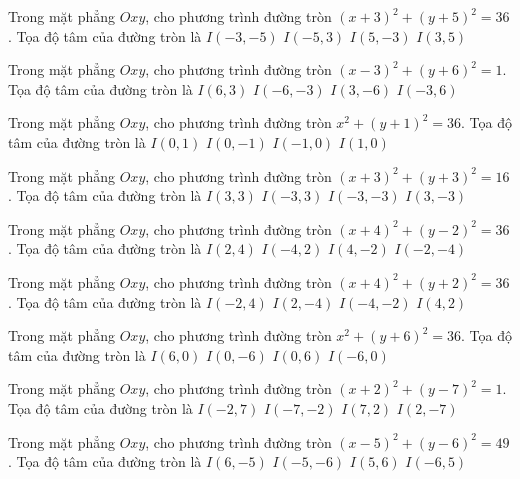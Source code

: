 \begin{ex}
Trong mặt phẳng $Oxy$, cho phương trình đường tròn $(x + 3)^2  + (y + 5)^2 = 36$. Tọa độ tâm của đường tròn là
\choice
{ \True $I(-3, -5)$ }
{ $I(-5, 3)$ }
{ $I(5, -3)$ }
{ $I(3, 5)$ }
\end{ex}

\begin{ex}
Trong mặt phẳng $Oxy$, cho phương trình đường tròn $(x -3)^2   + (y + 6)^2 = 1$. Tọa độ tâm của đường tròn là
\choice
{ $I(6, 3)$ }
{ $I(-6, -3)$ }
{ \True $I(3, -6)$ }
{ $I(-3, 6)$ }
\end{ex}

\begin{ex}
Trong mặt phẳng $Oxy$, cho phương trình đường tròn $x^2 + (y + 1)^2 = 36$. Tọa độ tâm của đường tròn là
\choice
{ $I(0, 1)$ }
{ \True $I(0, -1)$ }
{ $I(-1, 0)$ }
{ $I(1, 0)$ }
\end{ex}

\begin{ex}
Trong mặt phẳng $Oxy$, cho phương trình đường tròn $(x + 3)^2  + (y + 3)^2 = 16$. Tọa độ tâm của đường tròn là
\choice
{ $I(3, 3)$ }
{ $I(-3, 3)$ }
{ \True $I(-3, -3)$ }
{ $I(3, -3)$ }
\end{ex}

\begin{ex}
Trong mặt phẳng $Oxy$, cho phương trình đường tròn $(x + 4)^2  + (y -2)^2 = 36$. Tọa độ tâm của đường tròn là
\choice
{ $I(2, 4)$ }
{ \True $I(-4, 2)$ }
{ $I(4, -2)$ }
{ $I(-2, -4)$ }
\end{ex}

\begin{ex}
Trong mặt phẳng $Oxy$, cho phương trình đường tròn $(x + 4)^2  + (y + 2)^2 = 36$. Tọa độ tâm của đường tròn là
\choice
{ $I(-2, 4)$ }
{ $I(2, -4)$ }
{ \True $I(-4, -2)$ }
{ $I(4, 2)$ }
\end{ex}

\begin{ex}
Trong mặt phẳng $Oxy$, cho phương trình đường tròn $x^2 + (y + 6)^2 = 36$. Tọa độ tâm của đường tròn là
\choice
{ $I(6, 0)$ }
{ \True $I(0, -6)$ }
{ $I(0, 6)$ }
{ $I(-6, 0)$ }
\end{ex}

\begin{ex}
Trong mặt phẳng $Oxy$, cho phương trình đường tròn $(x + 2)^2  + (y -7)^2 = 1$. Tọa độ tâm của đường tròn là
\choice
{ \True $I(-2, 7)$ }
{ $I(-7, -2)$ }
{ $I(7, 2)$ }
{ $I(2, -7)$ }
\end{ex}

\begin{ex}
Trong mặt phẳng $Oxy$, cho phương trình đường tròn $(x -5)^2   + (y -6)^2 = 49$. Tọa độ tâm của đường tròn là
\choice
{ $I(6, -5)$ }
{ $I(-5, -6)$ }
{ \True $I(5, 6)$ }
{ $I(-6, 5)$ }
\end{ex}

